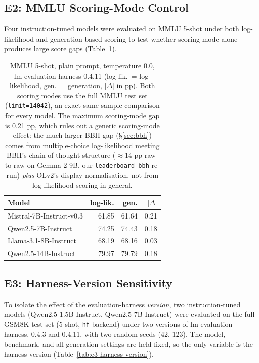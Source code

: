 \documentclass[11pt]{article}
\begin{document}
\subsection{E2: MMLU Scoring-Mode Control}
\label{app:exp-e2}

Four instruction-tuned models were evaluated on MMLU 5-shot under both
log-likelihood and generation-based scoring to test whether scoring mode
alone produces large score gaps (Table~\ref{tab:e2-scoring-mode}).

\begin{table}[ht]
\centering
\footnotesize
\setlength{\tabcolsep}{3pt}
\begin{tabular}{@{}lrrr@{}}
\toprule
Model & log-lik. & gen. & $|\Delta|$ \\
\midrule
Mistral-7B-Instruct-v0.3   & 61.85 & 61.64 & 0.21 \\
Qwen2.5-7B-Instruct        & 74.25 & 74.43 & 0.18 \\
Llama-3.1-8B-Instruct      & 68.19 & 68.16 & 0.03 \\
Qwen2.5-14B-Instruct       & 79.97 & 79.79 & 0.18 \\
\bottomrule
\end{tabular}
\caption{MMLU 5-shot, plain prompt, temperature 0.0, lm-evaluation-harness
0.4.11 (log-lik.\ = log-likelihood, gen.\ = generation, $|\Delta|$ in pp). Both scoring modes use the full MMLU test set
(\texttt{limit=14042}), an exact same-sample comparison for every model. The
maximum scoring-mode gap is 0.21 pp, which rules out a generic scoring-mode
effect: the much larger BBH gap (\S\ref{sec:bbh}) comes from multiple-choice
log-likelihood meeting BBH's chain-of-thought structure ($\approx$14 pp raw-to-raw
on Gemma-2-9B, our \texttt{leaderboard\_bbh} re-run) \emph{plus} OLv2's display
normalisation, not from log-likelihood scoring in general.}
\label{tab:e2-scoring-mode}
\end{table}


\subsection{E3: Harness-Version Sensitivity}
\label{app:exp-e3}

To isolate the effect of the evaluation-harness \emph{version}, two
instruction-tuned models (Qwen2.5-1.5B-Instruct, Qwen2.5-7B-Instruct) were
evaluated on the full GSM8K test set (5-shot, \texttt{hf} backend) under two
versions of lm-evaluation-harness, 0.4.3 and 0.4.11, with two random seeds
(42, 123). The model, benchmark, and all generation settings are held fixed, so
the only variable is the harness version (Table~\ref{tab:e3-harness-version}).
\end{document}
